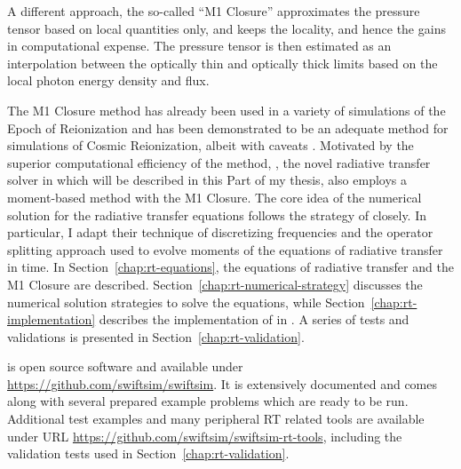 A different approach, the so-called ``M1 Closure''
\citep[e.g.][]{gonzalezHERACLESThreedimensionalRadiation2007, ramses-rt13,
kannanAREPORTRadiationHydrodynamics2019, fuksmanRadiativeTransferModule2019,
chanSmoothedParticleRadiation2021} approximates the pressure tensor based on local quantities only, and keeps the locality, and hence the gains in computational expense. The pressure tensor is then estimated as an interpolation between the optically thin and optically thick limits based on the local photon energy density and flux.

The M1 Closure method has already been used in a variety of simulations of the Epoch of Reionization
\citep[e.g.][]{rosdahlSPHINXCosmologicalSimulations2018,trebitschObeliskSimulationGalaxies2021,
xuTHESANProjectLymanalpha2022,borrowTHESANHRHowDoes2022, katzInterpretingALMAObservations2017} and has been demonstrated to be an adequate method for simulations of Cosmic Reionization, albeit with caveats \citep[see][]{wuAccuracyCommonMomentbased2021,ocvirkImpactReducedSpeed2019}. Motivated by the superior computational efficiency of the method, \GEARRT, the novel radiative transfer solver in \swift which will be described in this Part of my thesis, also employs a moment-based method with the M1 Closure. The core idea of the numerical solution for the radiative transfer equations follows the strategy of \cite{ramses-rt13} closely. In particular, I adapt their technique of discretizing frequencies and the operator splitting approach used to evolve moments of the equations of radiative transfer in time. In Section~\ref{chap:rt-equations}, the equations of radiative transfer and the M1 Closure are described. Section~\ref{chap:rt-numerical-strategy} discusses the numerical solution strategies to solve the equations, while Section~\ref{chap:rt-implementation} describes the implementation of \GEARRT in \swift. A series of tests and validations is presented in Section~\ref{chap:rt-validation}.


\GEARRT is open source software and available under \url{https://github.com/swiftsim/swiftsim}. It
is extensively documented and comes along with several prepared example problems which are ready to be run. Additional test examples and many peripheral RT related tools are available under URL
\url{https://github.com/swiftsim/swiftsim-rt-tools}, including the validation tests used in
Section~\ref{chap:rt-validation}.






